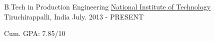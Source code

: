 \begin{cventries}
  \cventry
    {B.Tech in Production Engineering}
    {\href{http://www.nitt.edu/}{National Institute of Technology}}
    {Tiruchirappalli, India}
    {July. 2013 - PRESENT}
    {
      \begin{cvitems}
        \item {Cum. GPA: 7.85/10
        }
      \end{cvitems}
    }
\end{cventries}